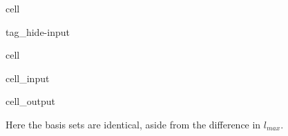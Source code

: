 \documentclass[letterpaper,table,10pt,english]{jupyterBook}
\begin{document}
\begin{sphinxuseclass}{cell}
\begin{sphinxuseclass}{tag_hide-input}
\end{sphinxuseclass}
\end{sphinxuseclass}
\begin{sphinxuseclass}{cell}\begin{sphinxVerbatimInput}

\begin{sphinxuseclass}{cell_input}
\begin{sphinxVerbatim}[commandchars=\\\{\}]
 
\end{sphinxVerbatim}

\end{sphinxuseclass}\end{sphinxVerbatimInput}
\begin{sphinxVerbatimOutput}

\begin{sphinxuseclass}{cell_output}
\end{sphinxuseclass}\end{sphinxVerbatimOutput}

\end{sphinxuseclass}
\sphinxAtStartPar
Here the basis sets are identical, aside from the difference in \(l_{max}\).
\end{document}
